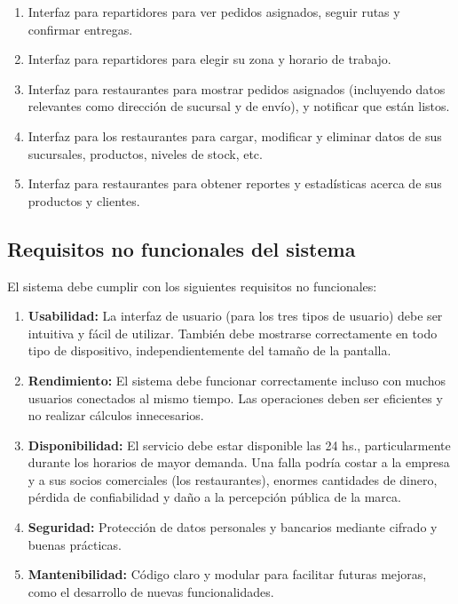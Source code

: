 \begin{enumerate}
    \item Interfaz para repartidores para ver pedidos asignados, seguir rutas y confirmar entregas.
    
    \item Interfaz para repartidores para elegir su zona y horario de trabajo.
    
    \item Interfaz para restaurantes para mostrar pedidos asignados (incluyendo datos relevantes como dirección de sucursal y de envío), y notificar que están listos.
    
    \item Interfaz para los restaurantes para cargar, modificar y eliminar datos de sus sucursales, productos, niveles de stock, etc.
    
    \item Interfaz para restaurantes para obtener reportes y estadísticas acerca de sus productos y clientes.
    
\end{enumerate}

\subsection{Requisitos no funcionales del sistema}

El sistema debe cumplir con los siguientes requisitos no funcionales:

\begin{enumerate}
\item \textbf{Usabilidad:} La interfaz de usuario (para los tres tipos de usuario) debe ser intuitiva y fácil de utilizar. También debe mostrarse correctamente en todo tipo de dispositivo, independientemente del tamaño de la pantalla.

\item \textbf{Rendimiento:} El sistema debe funcionar correctamente incluso con muchos usuarios conectados al mismo tiempo. Las operaciones deben ser eficientes y no realizar cálculos innecesarios.

\item \textbf{Disponibilidad:} El servicio debe estar disponible las 24 hs., particularmente durante los horarios de mayor demanda. Una falla podría costar a la empresa y a sus socios comerciales (los restaurantes), enormes cantidades de dinero, pérdida de confiabilidad y daño a la percepción pública de la marca.

\item \textbf{Seguridad:} Protección de datos personales y bancarios mediante cifrado y buenas prácticas.

\item \textbf{Mantenibilidad:} Código claro y modular para facilitar futuras mejoras, como el desarrollo de nuevas funcionalidades.
\end{enumerate}

